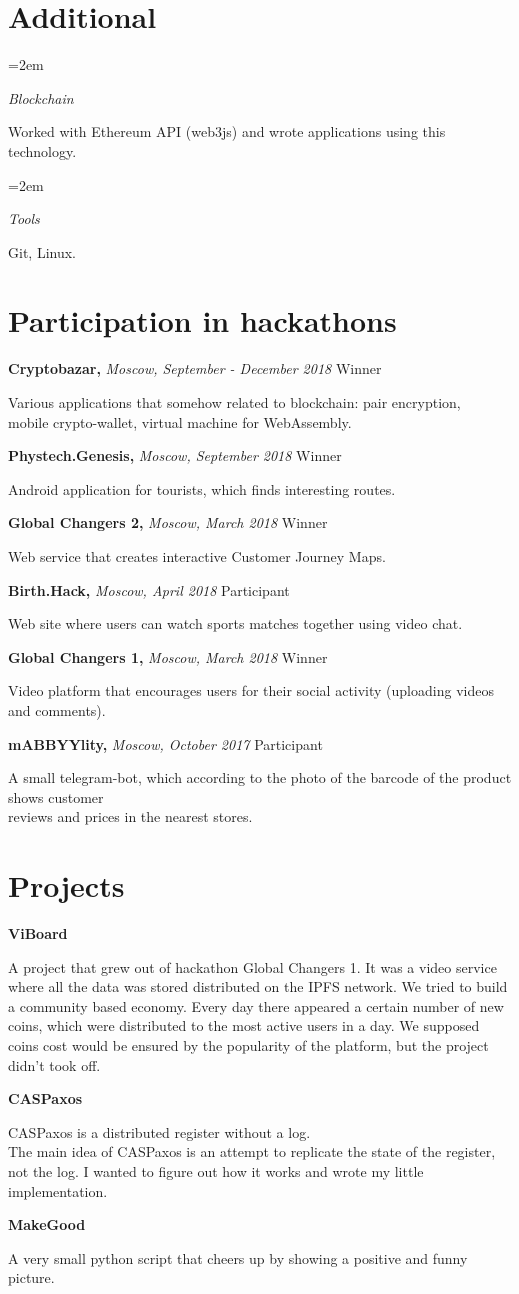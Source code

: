 \documentclass[fontsize=11pt]{article}
\newlength{\spacebox}
\newcommand{\sepspace}{\vspace*{1em}}   %
\newcommand{\NewPart}[1]{\section*{#1}}
\newcommand{\PersonalEntry}[2]{
    \noindent\hangindent=2em\hangafter=0 %
    \parbox{\spacebox}{                  %
    \textit{#1}}                      %
    \hspace{1.5em} #2 \par}              %
\newcommand{\SkillsEntry}[2]{                %
    \noindent\hangindent=2em\hangafter=0 %
    \parbox{\spacebox}{                  %
    \textit{#1}}                    %
    \hspace{1.5em} #2 \par}              %
\newcommand{\ProgrammingEntry}[2]{
    \noindent \textbf{#1} \hfill      %

    \noindent \small #2 %
    \normalsize \par}
\newcommand{\EducationEntry}[4]{
    \noindent \textbf{#1} \hfill      %
    \colorbox{Black}{
      \parbox{10em}{
      \color{White} \centering #2}} \par   %
    \noindent \textit{#3} \par        %
    \noindent\hangindent=2em\hangafter=0 \small #4 %
    \normalsize \par}
\newcommand{\AwardEntry}[4]{         %
    \noindent \textbf{#1} \noindent \textit{#3} \hfill {#2} \par
    \noindent \small #4 %
    \normalsize \par}
\begin{document}
\NewPart{Additional}{}
\SkillsEntry{Blockchain}{Worked with Ethereum API (web3js) and wrote applications using this technology.}
\SkillsEntry{Tools}{Git, Linux.}

\NewPart{Participation in hackathons}{}

\AwardEntry{Cryptobazar, }{Winner}
{Moscow, September - December 2018}
{Various applications that somehow related to blockchain: pair encryption, \\ mobile crypto-wallet, virtual machine for WebAssembly.}
\sepspace
\AwardEntry{Phystech.Genesis,}{Winner}
{Moscow, September 2018}
{Android application for tourists, which finds interesting routes.}
\sepspace
\AwardEntry{Global Changers 2,}{Winner}
{Moscow, March 2018}
{Web service that creates interactive Customer Journey Maps.}
\sepspace
\AwardEntry{Birth.Hack,}{Participant}
{Moscow, April 2018}
{Web site where users can watch sports matches together using video chat.}
\sepspace
\AwardEntry{Global Changers 1,}{Winner}
{Moscow, March 2018}
{Video platform that encourages users for their social activity (uploading videos and comments).}
\sepspace
\AwardEntry{mABBYYlity,}{Participant}
{Moscow, October 2017}
{A small telegram-bot, which according to the photo of the barcode of the product shows customer\\ reviews and prices in the nearest stores.}

\NewPart{Projects}{}
\ProgrammingEntry
{ViBoard}
{A project that grew out of hackathon Global Changers 1. It was a video service where all the data was stored distributed on the IPFS network. We tried to build a community based economy. Every day there appeared a certain number of new coins, which were distributed to the most active users in a day. We supposed coins cost would be ensured by the popularity of the platform, but the project didn't took off.}
\bigskip
\ProgrammingEntry
{CASPaxos}
{CASPaxos is a distributed register without a log. \\ The main idea of CASPaxos is an attempt to replicate the state of the register, not the log. I wanted to figure out how it works and wrote my little implementation.}
\bigskip
\ProgrammingEntry
{MakeGood}
{A very small python script that cheers up by showing a positive and funny picture.}
\end{document}
